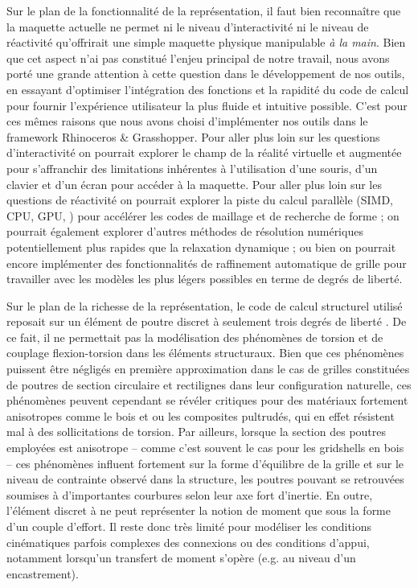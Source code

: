 Sur le plan de la fonctionnalité de la représentation, il faut bien reconnaître que la maquette actuelle ne permet ni le niveau d'interactivité ni le niveau de réactivité qu'offrirait une simple maquette physique manipulable \emph{à la main}. Bien que cet aspect n'ai pas constitué l'enjeu principal de notre travail, nous avons porté une grande attention à cette question dans le développement de nos outils, en essayant d'optimiser l'intégration des fonctions et la rapidité du code de calcul pour fournir l'expérience utilisateur la plus fluide et intuitive possible. C'est pour ces mêmes raisons que nous avons choisi d'implémenter nos outils dans le framework Rhinoceros \& Grasshopper. Pour aller plus loin sur les questions d'interactivité on pourrait explorer le champ de la réalité virtuelle et augmentée pour s'affranchir des limitations inhérentes à l'utilisation d'une souris, d'un clavier et d'un écran pour accéder à la maquette. Pour aller plus loin sur les questions de réactivité on pourrait explorer la piste du calcul parallèle (SIMD, CPU, GPU, \telp{}) pour accélérer les codes de maillage et de recherche de forme ; on pourrait également explorer d'autres méthodes de résolution numériques potentiellement plus rapides que la relaxation dynamique ; ou bien on pourrait encore implémenter des fonctionnalités de raffinement automatique de grille pour travailler avec les modèles les plus légers possibles en terme de degrés de liberté.

Sur le plan de la richesse de la représentation, le code de calcul structurel utilisé reposait sur un élément de poutre discret à seulement trois degrés de liberté \cite{Adriaenssens2000}. De ce fait, il ne permettait pas la modélisation des phénomènes de torsion et de couplage flexion-torsion dans les éléments structuraux. Bien que ces phénomènes puissent être négligés en première approximation dans le cas de grilles constituées de poutres de section circulaire et rectilignes dans leur configuration naturelle, ces phénomènes peuvent cependant se révéler critiques pour des matériaux fortement anisotropes comme le bois et ou les composites pultrudés, qui en effet résistent mal à des sollicitations de torsion. Par ailleurs, lorsque la section des poutres employées est anisotrope -- comme c'est souvent le cas pour les gridshells en bois -- ces phénomènes influent fortement sur la forme d'équilibre de la grille et sur le niveau de contrainte observé dans la structure, les poutres pouvant se retrouvées soumises à d'importantes courbures selon leur axe fort d'inertie. En outre, l'élément discret à  ne peut représenter la notion de moment que sous la forme d'un couple d'effort. Il reste donc très limité pour modéliser les conditions cinématiques parfois complexes des connexions ou des conditions d'appui, notamment lorsqu'un transfert de moment s'opère (e.g. au niveau d'un encastrement).

